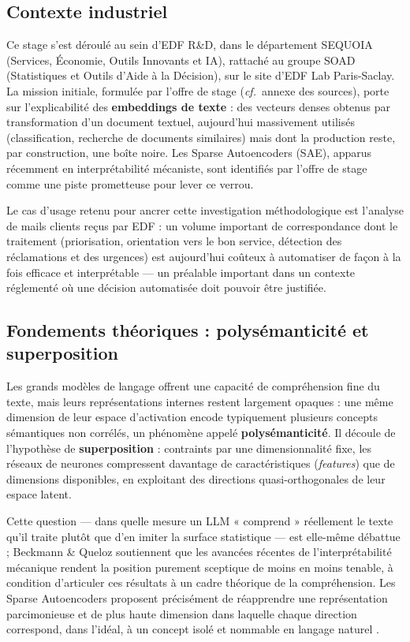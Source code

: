 \documentclass[11pt]{article}
\begin{document}
\subsection{Contexte industriel}

Ce stage s'est déroulé au sein d'EDF R\&D, dans le département SEQUOIA
(Services, Économie, Outils Innovants et IA), rattaché au groupe SOAD
(Statistiques et Outils d'Aide à la Décision), sur le site d'EDF Lab
Paris-Saclay. La mission initiale, formulée par l'offre de stage
(\emph{cf.}~annexe des sources), porte sur l'explicabilité des
\textbf{embeddings de texte} : des vecteurs denses obtenus par transformation
d'un document textuel, aujourd'hui massivement utilisés (classification,
recherche de documents similaires) mais dont la production reste, par
construction, une boîte noire. Les Sparse Autoencoders (SAE), apparus
récemment en interprétabilité mécaniste, sont identifiés par l'offre de stage
comme une piste prometteuse pour lever ce verrou.

Le cas d'usage retenu pour ancrer cette investigation méthodologique est
l'analyse de mails clients reçus par EDF : un volume important de
correspondance dont le traitement (priorisation, orientation vers le bon
service, détection des réclamations et des urgences) est aujourd'hui coûteux à
automatiser de façon à la fois efficace et interprétable --- un préalable
important dans un contexte réglementé où une décision automatisée doit
pouvoir être justifiée.

\subsection{Fondements théoriques : polysémanticité et superposition}

Les grands modèles de langage offrent une capacité de compréhension fine du
texte, mais leurs représentations internes restent largement opaques : une
même dimension de leur espace d'activation encode typiquement plusieurs
concepts sémantiques non corrélés, un phénomène appelé
\textbf{polysémanticité}. Il découle de l'hypothèse de \textbf{superposition}
\cite{elhage2022superposition} : contraints par une dimensionnalité fixe, les
réseaux de neurones compressent davantage de caractéristiques (\emph{features})
que de dimensions disponibles, en exploitant des directions quasi-orthogonales
de leur espace latent.

Cette question --- dans quelle mesure un LLM « comprend » réellement le texte
qu'il traite plutôt que d'en imiter la surface statistique --- est elle-même
débattue ; Beckmann \& Queloz \cite{beckmannqueloz2026} soutiennent que les avancées récentes de
l'interprétabilité mécanique rendent la position purement sceptique de moins
en moins tenable, à condition d'articuler ces résultats à un cadre théorique de
la compréhension. Les Sparse Autoencoders proposent précisément de réapprendre
une représentation parcimonieuse et de plus haute dimension dans laquelle
chaque direction correspond, dans l'idéal, à un concept isolé et nommable en
langage naturel \cite{bricken2023monosemanticity, cunningham2023sparse}.
\end{document}
